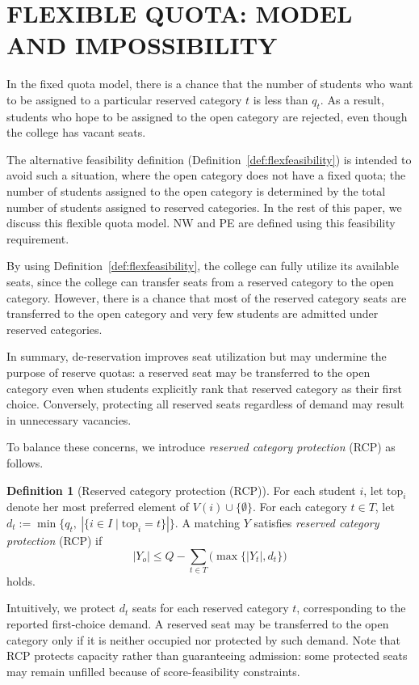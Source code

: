 \documentclass[a4paper,twoside]{article}
\theoremstyle{definition}
\newtheorem{definition}{Definition}
\newcommand{\topc}{\mathrm{top}}
\begin{document}
\section{\uppercase{Flexible Quota: Model and Impossibility}}
\label{sec:flexible}
In the fixed quota model, there is a chance that 
the number of students who want to be assigned to a particular reserved 
category $t$ is less than $q_t$. As a result, students who hope to be assigned 
to the open category are rejected, even though the college has vacant seats. 

The alternative feasibility definition (Definition~\ref{def:flexfeasibility}) 
is intended to avoid such a situation, where the open category 
does not have a fixed quota; the number of students assigned to 
the open category is determined by the total number of students assigned 
to reserved categories. 
In the rest of this paper, we discuss this flexible quota model. 
NW and PE are defined using this feasibility requirement. 

By using Definition~\ref{def:flexfeasibility}, the college can fully utilize
its available seats, since the college can transfer seats from a reserved category to the open category. However, there is a chance that most of the reserved category seats are transferred to the open category and very few students are admitted under 
reserved categories.

In summary, de-reservation improves seat utilization but may undermine the
purpose of reserve quotas: a reserved seat may be transferred to
the open category even when students explicitly rank that reserved
category as their first choice.
Conversely, protecting all reserved seats regardless of demand
may result in unnecessary vacancies.

To balance these concerns, we introduce
\emph{reserved category protection} (RCP) as follows. 
\begin{definition}[Reserved category protection (RCP)]
\label{def:rcp}
For each student $i$, let $\topc_i$ denote her most preferred element of
$V(i)\cup\{\emptyset\}$.
For each category $t\in T$, let
$d_t:=\min\{q_t,\ |\{i\in I\mid\topc_i=t\}|\}$.
A matching $Y$ satisfies \emph{reserved category protection} (RCP) if
\begin{equation}
\label{eq:rcpdef}
|Y_o|\le Q- \sum_{t\in T}\bigl(\max\{|Y_t|,d_t\}\bigr)
\end{equation}
holds.
\end{definition}
Intuitively, we protect $d_t$ seats for each reserved category $t$, corresponding to the reported first-choice demand.
A reserved seat may be transferred to the open category only if
it is neither occupied nor protected by such demand.
Note that RCP protects capacity rather than guaranteeing admission:
some protected seats may remain unfilled because of
score-feasibility constraints.
\end{document}
